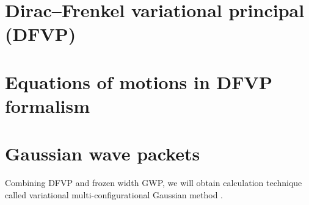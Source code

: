 \documentclass[a4paper,14pt]{extarticle}
\begin{document}
\section{Dirac--Frenkel variational principal (DFVP)}




\section{Equations of motions in DFVP formalism}



\section{Gaussian wave packets}



Combining DFVP and frozen width GWP, we will obtain calculation technique called variational multi-configurational Gaussian method \cite{vmcg}.

%



\end{document}
